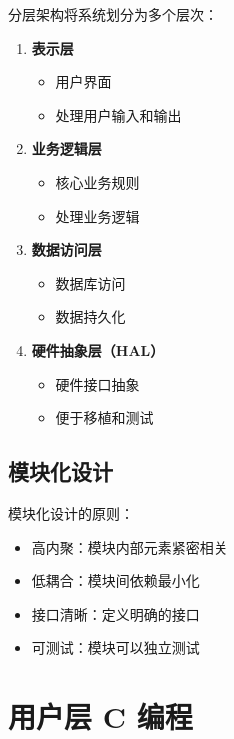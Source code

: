 
分层架构将系统划分为多个层次：

\begin{enumerate}
  \item \textbf{表示层}
    \begin{itemize}
      \item 用户界面
      \item 处理用户输入和输出
    \end{itemize}

  \item \textbf{业务逻辑层}
    \begin{itemize}
      \item 核心业务规则
      \item 处理业务逻辑
    \end{itemize}

  \item \textbf{数据访问层}
    \begin{itemize}
      \item 数据库访问
      \item 数据持久化
    \end{itemize}

  \item \textbf{硬件抽象层（HAL）}
    \begin{itemize}
      \item 硬件接口抽象
      \item 便于移植和测试
    \end{itemize}
\end{enumerate}

\subsection{模块化设计}


模块化设计的原则：
\begin{itemize}
  \item 高内聚：模块内部元素紧密相关
  \item 低耦合：模块间依赖最小化
  \item 接口清晰：定义明确的接口
  \item 可测试：模块可以独立测试
\end{itemize}

\section{用户层 C 编程}

